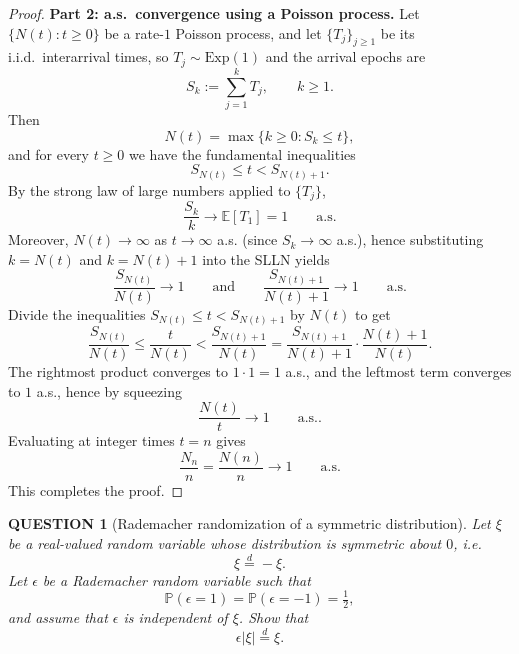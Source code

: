 \documentclass[12pt]{article}
\renewcommand{\(}{\left(}%
\renewcommand{\)}{\right)}%
\renewcommand{\[}{\left[}%
\renewcommand{\]}{\right]}%
\newtheorem{question}{QUESTION}[section]}
\newtheorem{proof}{Proof.}}
\begin{document}
\begin{proof}
\medskip
\textbf{Part 2: a.s.\ convergence using a Poisson process.}
Let $\{N(t):t\ge0\}$ be a rate-$1$ Poisson process, and let $\{T_j\}_{j\ge1}$ be its i.i.d.\ interarrival times, so $T_j\sim \mathrm{Exp}(1)$ and the arrival epochs are
\begin{equation*}
S_k:=\sum_{j=1}^k T_j,
\qquad k\ge1.
\end{equation*}
Then
\begin{equation*}
N(t)=\max\{k\ge0:S_k\le t\},
\end{equation*}
and for every $t\ge0$ we have the fundamental inequalities
\begin{equation*}
S_{N(t)}\le t<S_{N(t)+1}.
\end{equation*}
By the strong law of large numbers applied to $\{T_j\}$,
\begin{equation*}
\frac{S_k}{k}\to \mathbb E[T_1]=1
\qquad\text{a.s.}
\end{equation*}
Moreover, $N(t)\to\infty$ as $t\to\infty$ a.s. (since $S_k\to\infty$ a.s.), hence substituting $k=N(t)$ and $k=N(t)+1$ into the SLLN yields
\begin{equation*}
\frac{S_{N(t)}}{N(t)}\to 1
\qquad\text{and}\qquad
\frac{S_{N(t)+1}}{N(t)+1}\to 1
\qquad\text{a.s.}
\end{equation*}
Divide the inequalities $S_{N(t)}\le t<S_{N(t)+1}$ by $N(t)$ to get
\begin{equation*}
\frac{S_{N(t)}}{N(t)}
\le
\frac{t}{N(t)}
<
\frac{S_{N(t)+1}}{N(t)}
=
\frac{S_{N(t)+1}}{N(t)+1}\cdot\frac{N(t)+1}{N(t)}.
\end{equation*}
The rightmost product converges to $1\cdot 1=1$ a.s., and the leftmost term converges to $1$ a.s., hence by squeezing
\begin{equation*}
\frac{N(t)}{t}\to 1
\qquad\text{a.s.}.
\end{equation*}
Evaluating at integer times $t=n$ gives
\begin{equation*}
\frac{N_n}{n}=\frac{N(n)}{n}\to 1
\qquad\text{a.s.}
\end{equation*}
This completes the proof.
\end{proof}

\begin{question}[Rademacher randomization of a symmetric distribution]
Let $\xi$ be a real-valued random variable whose distribution is symmetric about $0$, i.e.
\begin{equation*}
\xi \overset{d}{=} -\xi .
\end{equation*}
Let $\epsilon$ be a Rademacher random variable such that
\begin{equation*}
\mathbb P(\epsilon=1)=\mathbb P(\epsilon=-1)=\tfrac12,
\end{equation*}
and assume that $\epsilon$ is independent of $\xi$. Show that
\begin{equation*}
\epsilon |\xi| \overset{d}{=} \xi .
\end{equation*}
\end{question}
\end{document}
